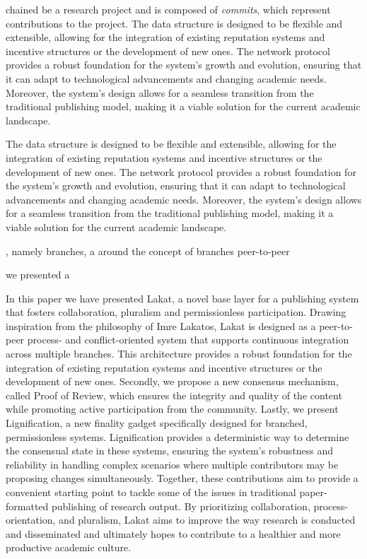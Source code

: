 chained  be  a research project and is composed of \emph{commits}, which represent contributions to the project. The data structure is designed to be flexible and extensible, allowing for the integration of existing reputation systems and incentive structures or the development of new ones. The network protocol provides a robust foundation for the system's growth and evolution, ensuring that it can adapt to technological advancements and changing academic needs. Moreover, the system's design allows for a seamless transition from the traditional publishing model, making it a viable solution for the current academic landscape. 


The data structure is designed to be flexible and extensible, allowing for the integration of existing reputation systems and incentive structures or the development of new ones. The network protocol provides a robust foundation for the system's growth and evolution, ensuring that it can adapt to technological advancements and changing academic needs. Moreover, the system's design allows for a seamless transition from the traditional publishing model, making it a viable solution for the current academic landscape. 

, namely branches,   a  around the concept of branches  peer-to-peer 

we presented a 


In this paper we have presented Lakat, a novel base layer for a publishing system that fosters collaboration, pluralism and permissionless participation. Drawing inspiration from the philosophy of Imre Lakatos, Lakat is designed as a peer-to-peer process- and conflict-oriented system that supports continuous integration across multiple branches. This architecture provides a robust foundation for the  integration of existing reputation systems and incentive structures or the development of new ones. Secondly, we propose a new consensus mechanism, called Proof of Review, which ensures the integrity and quality of the content while promoting active participation from the community. Lastly, we present Lignification, a new finality gadget specifically designed for branched, permissionless systems. Lignification provides a deterministic way to determine the consensual state in these systems, ensuring the system's robustness and reliability in handling complex scenarios where multiple contributors may be proposing changes simultaneously. Together, these contributions aim to provide a convenient starting point to tackle some of the issues in traditional paper-formatted publishing of research output. By prioritizing collaboration, process-orientation, and pluralism, Lakat aims to improve the way research is conducted and disseminated and ultimately hopes to contribute to a healthier and more productive academic culture.


